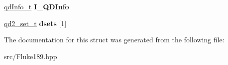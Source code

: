 \begin{DoxyCompactItemize}
\item 
\hypertarget{structFluke_1_1Fluke189_1_1cmdr__QD2__t_a924ed3179306859794c6544fe9848f00}{
\hyperlink{structFluke_1_1Fluke189_1_1qdInfo__t}{qdInfo\_\-t} {\bfseries I\_\-QDInfo}}
\label{structFluke_1_1Fluke189_1_1cmdr__QD2__t_a924ed3179306859794c6544fe9848f00}

\item 
\hypertarget{structFluke_1_1Fluke189_1_1cmdr__QD2__t_ad097cbf0f6307f10a189d76512ead34e}{
\hyperlink{structFluke_1_1Fluke189_1_1qd2__set__t}{qd2\_\-set\_\-t} {\bfseries dsets} \mbox{[}1\mbox{]}}
\label{structFluke_1_1Fluke189_1_1cmdr__QD2__t_ad097cbf0f6307f10a189d76512ead34e}

\end{DoxyCompactItemize}


The documentation for this struct was generated from the following file:\begin{DoxyCompactItemize}
\item 
src/Fluke189.hpp\end{DoxyCompactItemize}
